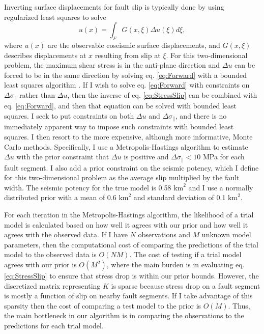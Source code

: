 \documentclass[12pt]{article}
\begin{document}
Inverting surface displacements for fault slip is typically done by using regularized least squares to solve
\begin{equation}\label{eq:Forward}
  u(x) = \int_F G(x,\xi) \Delta u(\xi) d\xi,
\end{equation}
where $u(x)$ are the observable coseismic surface displacements, and $G(x,\xi)$ describes displacements at $x$ resulting from slip at $\xi$.  For this two-dimensional problem, the maximum shear stress is in the anti-plane direction and $\Delta u$ can be forced to be in the same direction by solving eq. \ref{eq:Forward} with a bounded least squares algorithm \citep{Lawson1995}.  If I wish to solve eq. \ref{eq:Forward} with constraints on $\Delta \sigma_\parallel$ rather than $\Delta u$, then the inverse of eq. \ref{eq:StressSlip} can be combined with eq. \ref{eq:Forward}, and then that equation can be solved with bounded least squares. I seek to put constraints on both $\Delta u$ and $\Delta \sigma_\parallel$, and there is no immediately apparent way to impose such constraints with bounded least squares. I then resort to the more expensive, although more informative, Monte Carlo methods.  Specifically, I use a Metropolis-Hastings algorithm to estimate $\Delta u$ with the prior constraint that $\Delta u$ is positive and $\Delta \sigma_\parallel < 10$ MPa for each fault segment. I also add a prior constraint on the seismic potency, which I define for this two-dimensional problem as the average slip multiplied by the fault width.  The seismic potency for the true model is 0.58 $\mathrm{km}^2$ and I use a normally distributed prior with a mean of 0.6 $\mathrm{km}^2$ and standard deviation of 0.1 $\mathrm{km}^2$.  

For each iteration in the Metropolis-Hastings algorithm, the likelihood of a trial model is calculated based on how well it agrees with our prior and how well it agrees with the observed data.  If I have $N$ observations and $M$ unknown model parameters, then the computational cost of comparing the predictions of the trial model to the observed data is $O(NM)$. The cost of testing if a trial model agrees with our prior is $O(M^2)$, where the main burden is in evaluating eq. \ref{eq:StressSlip} to ensure that stress drop is within our prior bounds.  However, the discretized matrix representing $K$ is sparse because stress drop on a fault segment is mostly a function of slip on nearby fault segments.  If I take advantage of this sparsity then the cost of comparing a test model to the prior is $O(M)$.  Thus, the main bottleneck in our algorithm is in comparing the observations to the predictions for each trial model.  
\end{document}

